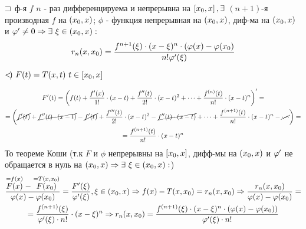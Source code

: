 \begin{proofs}
	$\sqsupset$ ф-я $f$ $n$ - раз дифференцируема и непрерывна на $\left[ x_0,x\right], \exists$ $(n+1)$-я производная $f$ на $\left( x_0,x\right)$; $\phi$ - функция непрерывная на $\left( x_0,x\right)$, диф-ма на $\left( x_0,x\right)$ и $\varphi^{\prime} \neq 0 \Rightarrow \exists \ \xi \in \left( x_0,x\right) :$
	$$ r_n(x,x_0)= \frac{f^{n+1}(\xi)\cdot (x-\xi)^{n}\cdot (\varphi(x) - \varphi(x_0)}{n!\varphi^{\prime}(\xi)}$$

\begin{dokvo}
	$<\mkern-4mu) \ F(t) = T(x,t) \ t \in \left[ x_0,x\right]$

	\begin{gather*}
		F^{\prime}(t) = \left( f(t) + \frac{f^\prime(x)}{1!}\cdot (x-t) + \frac{f^{\prime\prime}(t)}{2!}\cdot (x-t)^{2} + \cdots + \frac{f^{(n)}(t)}{n!}\cdot (x-t)^{n}\right)^{\prime} = \\
		= \left( \cancel{f^{\prime}(t)} + \cancel{f^{\prime\prime}(t)\cdot (x-t)} - \cancel{f^{\prime}(t)} + \frac{f^{\prime\prime\prime}(t)}{2!}\cdot(x-t)^{2} - \cancel{f^{\prime\prime}(t)\cdot (x-t)} + \cdots + \frac{f^{(n+1)}(t)}{n!}\cdot (x-t)^n - \cancel{\cdots}\right) = \\
		= \frac{f^{(n+1)}(t)}{n!}\cdot (x-t)^{n}
	\end{gather*}
	То теореме Коши (т.к $F$ и $\phi$ непрерывны на $\left[ x_0,x\right]$, дифф-мы на $\left( x_0,x\right)$ и $\varphi^\prime$ не обращается в нуль на $\left( x_0,x\right) \Rightarrow \exists \ \xi \in \left( x_0,x\right):$)
	\begin{gather*}
		\frac{\stackrel{=f(x)}{F(x)}-\stackrel{=T(x,x_0)}{F(x_0)}}{\varphi(x)-\varphi(x_0)} = \frac{F^{\prime}(\xi)}{\varphi^{\prime}(\xi)}, \xi \in \left( x_0,x\right) \Rightarrow f(x) - T(x,x_0) = r_n(x,x_0) \Rightarrow \frac{r_n(x,x_0)}{\varphi(x)-\varphi(x_0)} = \\
		= \frac{f^{(n+1)}(\xi)}{\varphi^{\prime}(\xi)\cdot n!}\cdot (x-\xi)^{n} \Rightarrow r_n(x,x_0) = \frac{f^{(n+1)}(\xi) \cdot (x-\xi)^{n} \cdot (\varphi(x)-\varphi(x_0))}{\varphi^{\prime}(\xi) \cdot n!}
	\end{gather*}
\end{dokvo}

\end{proofs}

